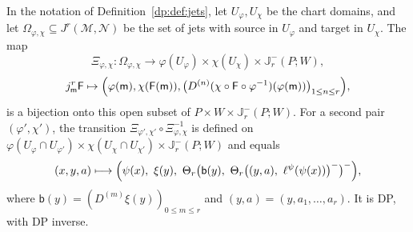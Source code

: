 \begin{theorem}\label{dp:thm:jet-local}
In the notation of Definition~\ref{dp:def:jets}, let $U_\varphi,U_\chi$ be the chart domains, and let $\Omega_{\varphi,\chi}\subseteq J^r(\mathcal M,\mathcal N)$ be the set of jets with source in $U_\varphi$ and target in $U_\chi$. The map
\[
 \Xi_{\varphi,\chi}\colon\Omega_{\varphi,\chi}\to\varphi(U_\varphi)\times\chi(U_\chi)\times\mathbb J^-_r(P;W),
\]
\[
 j^r_{\mathsf m}\mathsf F\mapsto\Bigl(\varphi(\mathsf m),\chi(\mathsf F(\mathsf m)),\bigl(D^{(n)}(\chi\circ\mathsf F\circ\varphi^{-1})(\varphi(\mathsf m))\bigr)_{1\le n\le r}\Bigr),
\]
is a bijection onto this open subset of $P\times W\times\mathbb J^-_r(P;W)$. For a second pair $(\varphi',\chi')$, the transition $\Xi_{\varphi',\chi'}\circ\Xi_{\varphi,\chi}^{-1}$ is defined on $\varphi(U_\varphi\cap U_{\varphi'})\times\chi(U_\chi\cap U_{\chi'})\times\mathbb J^-_r(P;W)$ and equals
\begin{equation}\label{dp:13:eq:transition}
 (x,y,a)\longmapsto\Bigl(\psi(x),\ \xi(y),\ \Theta_r\bigl(\mathsf b(y),\ \Theta_r\bigl((y,a),\ \ell^\psi(\psi(x))\bigr)^-\bigr)^-\Bigr),
\end{equation}
where $\mathsf b(y)=(D^{(m)}\xi(y))_{0\le m\le r}$ and $(y,a)=(y,a_1,\dots,a_r)$. It is DP, with DP inverse.
\end{theorem}

